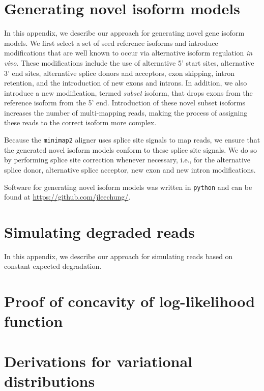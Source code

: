 
\chapter{Generating novel isoform models}\label{ap:gen-novl-iso}

In this appendix, we describe our approach for generating novel gene isoform models. We first select a set of seed reference isoforms and introduce modifications that are well known to occur via alternative isoform regulation \textit{in vivo}. These modifications include the use of alternative 5' start sites, alternative 3' end sites, alternative splice donors and acceptors, exon skipping, intron retention, and the introduction of new exons and introns. In addition, we also introduce a new modification, termed \textit{subset} isoform, that drops exons from the reference isoform from the 5' end. Introduction of these novel subset isoforms increases the number of multi-mapping reads, making the process of assigning these reads to the correct isoform more complex. 


Because the \texttt{minimap2} aligner uses splice site signals to map reads, we ensure that the generated novel isoform models conform to these splice site signals. We do so by performing splice site correction whenever necessary, i.e., for the alternative splice donor, alternative splice acceptor, new exon and new intron modifications. 


Software for generating novel isoform models was written in \texttt{python} and can be found at \url{https://github.com/jleechung/}.

\chapter{Simulating degraded reads}\label{ap:sim-deg-reads}

In this appendix, we describe our approach for simulating reads based on constant expected degradation.

\chapter{Proof of concavity of log-likelihood function}\label{sec:proof-log-lik}

\lipsum[77]

\chapter{Derivations for variational distributions}\label{sec:variational-dist}

